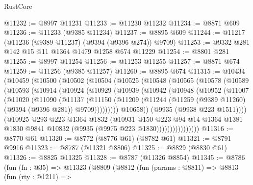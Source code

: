 \begin{lexlean}{RustCore}
\begin{coremodule}
@11232 := @8997 @11231
@11233 := @11230 @11232
@11234 := @8871 @609
@11236 := @11233 (@9385 @11234)
@11237 := @8895 @609
@11244 := @11217 (@11236 (@9389 @11237) (@9394 (@9396 @274)) @9709)
@11253 := @9332 @281 @142 @15 @11 @1364 @1479 @1258 @674 @11229
@11254 := @8801 @281
@11255 := @8997 @11254
@11256 := @11253 @11255
@11257 := @8871 @674
@11259 := @11256 (@9385 @11257)
@11260 := @8895 @674
@11315 := @10434
    (@10459
      (@10500
        (@10502
          (@10504
            (@10525
              (@10548
                (@10565
                  (@10578
                    (@10589
                      (@10593
                        (@10914
                          (@10924
                            (@10929
                              (@10939
                                (@10942
                                  (@10948
                                    (@10952
                                      (@11007
                                        (@11020
                                          (@11090
                                            (@11137
                                              (@11150
                                                (@11209
                                                  (@11244
                                                    (@11259
                                                      (@9389 @11260)
                                                      (@9394 (@9396 @281))
                                                      @9709)))))))))
                                    @10658))
                                (@9935 (@9938 @223 @1511))))
                            (@10925
                              @293
                              @223
                              @1364
                              @1832
                              (@10931
                                @150
                                @223
                                @94
                                @14
                                @1364
                                @1381
                                @1830
                                @9841
                                @10832
                                (@9935 (@9975 @223 @1830))))))))))))))))
@11316 := @8770 @61
@11320 := @8772 (@8776 @61) (@8782 @61)
@11321 := @8791 @9916
@11323 := @8787 (@11321 @8806)
@11325 := @8829 (@8830 @61)
@11326 := @8825 @11325
@11328 := @8787 (@11326 @8854)
@11345 := @8786
    (fun (fn : @35) =>
    @11323
      (@8809
        (@8812
          (fun (params : @8811) =>
          @8813
            (fun (rty : @1211) =>

\end{coremodule}
\end{lexlean}
